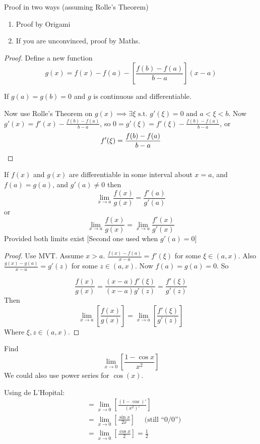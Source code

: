 \documentclass[10pt]{scrartcl}
\begin{document}
Proof in two ways (assuming Rolle's Theorem)

\begin{enumerate}
  \item Proof by Origami
  \item If you are unconvinced, proof by Maths. 
\end{enumerate}

\begin{proof}
Define a new function 
\[g(x) = f(x) - f(a) - \left[\frac{f(b) -f(a)}{b-a}\right](x-a)\]

If $g(a) = g(b) = 0$ and $g$ is continuous and differentiable. 

Now use Rolle's Theorem on $g(x) \implies \exists \xi \text{ s.t. } g'(\xi) = 0 \text{ and } a < \xi < b$. Now $g'(x) = f'(x) - \frac{f(b) - f(a)}{b-a}$, so 
$0 = g'(\xi) = f'(\xi) - \frac{f(b) - f(a)}{b-a}$, or
\[f'(\xi) = \frac{f(b) - f(a)}{b-a}\qedhere\]
\end{proof}


\vspace*{5pt}

\begin{theorem}
If $f(x)$ and $g(x)$ are differentiable in some interval about $x=a$, and $f(a) = g(a)$, and $g'(a) \neq 0$ then 
\[\lim_{x \to a}\frac{f(x)}{g(x)} = \frac{f'(a)}{g'(a)}\]	
or
\[\lim_{x \to a}\frac{f(x)}{g(x)} = \lim_{x \to a}\frac{f'(x)}{g'(x)}\]	
Provided both limits exist [Second one used when $g'(a) = 0$]
\end{theorem}


\begin{proof}
Use MVT. Assume $x > a$. 
$\frac{f(x) - f(a)}{x-a} = f'(\xi)$
for some $\xi \in (a,x)$. Also 
$\frac{g(x) - g(a)}{x-a} = g'(z)$
for some $z \in (a,x)$. Now $f(a) = g(a) = 0$. So 

\[\frac{f(x)}{g(x)} = \frac{(x-a)f'(\xi)}{(x-a)g'(z)} = \frac{f'(\xi)}{g'(z)}\]
Then 
\[\lim_{x \to a} \left[\frac{f(x)}{g(x)}\right] = \lim_{x \to a}\left[\frac{f'(\xi)}{g'(z)}\right]\]
Where $\xi, z \in (a,x)$. 
\end{proof}\vspace*{5pt}


\begin{example}
Find 
\[\lim_{x \to 0}\left[\frac{1-\cos x}{x^2}\right]\]
We could also use power series for $\cos(x)$. 

Using de L'Hopital: 
\[
\begin{aligned}
  &= \lim_{x \to 0}\left[\frac{(1-\cos)'}{(x^2)'}\right]\\
  &= \lim_{x \to 0}\left[\frac{\sin x}{2x}\right]\quad \mbox{ (still ``$0/0$'')}\\
  &= \lim_{x \to 0}\left[\frac{\cos x}{2}\right] = \frac{1}{2}
\end{aligned}
\]
\end{example}\vspace*{5pt}
\end{document}
